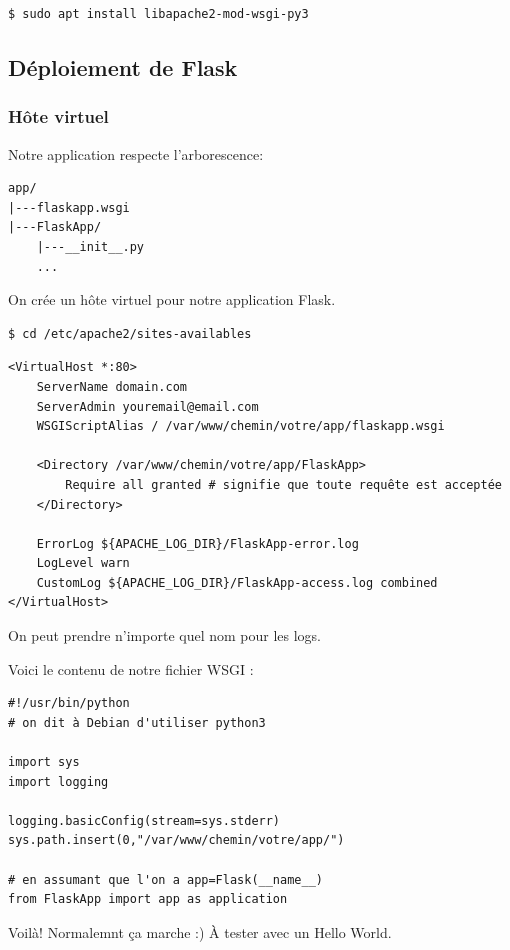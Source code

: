 \documentclass[a4paper, 10pt]{article}
\begin{document}
\begin{verbatim}
$ sudo apt install libapache2-mod-wsgi-py3
\end{verbatim}

\subsection{Déploiement de Flask}
\subsubsection{Hôte virtuel}

Notre application respecte l'arborescence:
\begin{verbatim}
app/
|---flaskapp.wsgi
|---FlaskApp/
    |---__init__.py
    ...
\end{verbatim}

On crée un hôte virtuel pour notre application Flask.

\begin{verbatim}
$ cd /etc/apache2/sites-availables
\end{verbatim}

\begin{verbatim}
<VirtualHost *:80>
    ServerName domain.com
    ServerAdmin youremail@email.com
    WSGIScriptAlias / /var/www/chemin/votre/app/flaskapp.wsgi

    <Directory /var/www/chemin/votre/app/FlaskApp>
        Require all granted # signifie que toute requête est acceptée
    </Directory>

    ErrorLog ${APACHE_LOG_DIR}/FlaskApp-error.log
    LogLevel warn
    CustomLog ${APACHE_LOG_DIR}/FlaskApp-access.log combined
</VirtualHost>
\end{verbatim}

On peut prendre n'importe quel nom pour les logs.

Voici le contenu de notre fichier WSGI :

\begin{verbatim}
#!/usr/bin/python
# on dit à Debian d'utiliser python3

import sys
import logging

logging.basicConfig(stream=sys.stderr)
sys.path.insert(0,"/var/www/chemin/votre/app/")

# en assumant que l'on a app=Flask(__name__)
from FlaskApp import app as application
\end{verbatim}

Voilà! Normalemnt ça marche :) À tester avec un Hello World.
\end{document}
